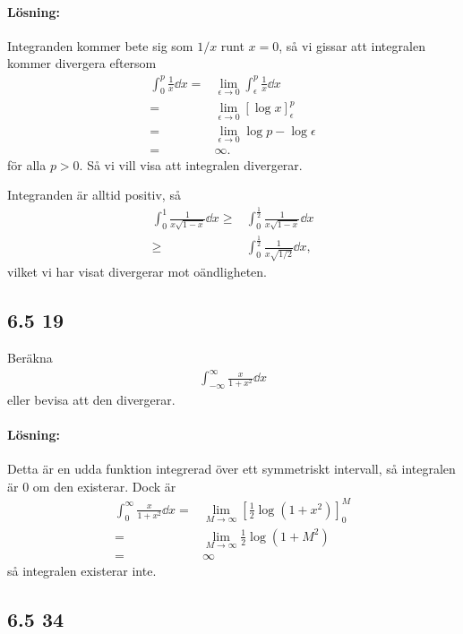 \paragraph{Lösning:}

Integranden kommer bete sig som $1 / x$ runt $x = 0$, så vi gissar att integralen kommer divergera eftersom
\begin{align*}
	\int_0^p \frac{1}{x} \dd{x} ={}& \lim_{\epsilon \to 0} \int_\epsilon^p \frac{1}{x} \dd{x}\\
	={}& \lim_{\epsilon \to 0} [\log{x}]_\epsilon^p\\
	={}& \lim_{\epsilon \to 0} \log{p} - \log{\epsilon}\\
	={}& \infty.
\end{align*}
för alla $p > 0$.
Så vi vill visa att integralen divergerar.

Integranden är alltid positiv, så
\begin{align*}
	\int_0^1 \frac{1}{x \sqrt{1 - x}} \dd{x} \geq{}& \int_0^\frac{1}{2} \frac{1}{x \sqrt{1 - x}} \dd{x}\\
	\geq{}& \int_0^\frac{1}{2} \frac{1}{x \sqrt{1 / 2}} \dd{x},
\end{align*}
vilket vi har visat divergerar mot oändligheten.


\subsection{6.5 19}%
\label{sub:6_5_19}

Beräkna
\begin{align*}
	\int_{-\infty}^\infty \frac{x}{1 + x^2} \dd{x}
\end{align*}
eller bevisa att den divergerar.

\paragraph{Lösning:}

Detta är en udda funktion integrerad över ett symmetriskt intervall, så integralen är $0$ om den existerar.
Dock är
\begin{align*}
	\int_{0}^\infty \frac{x}{1 + x^2} \dd{x} ={}& \lim_{M \to \infty} [\frac{1}{2} \log{(1 + x^2)}]_0^M\\
	={}& \lim_{M \to \infty} \frac{1}{2} \log{(1 + M^2)}\\
	={}& \infty
\end{align*}
så integralen existerar inte.


\subsection{6.5 34}%
\label{sub:6_5_34}

